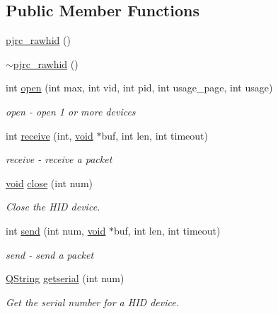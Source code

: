 \subsection*{\-Public \-Member \-Functions}
\begin{DoxyCompactItemize}
\item 
\hyperlink{group___raw_h_i_d_plugin_gac45cb09ef64b6ae7d47e4d8a3a8ffdbe}{pjrc\-\_\-rawhid} ()
\item 
\hyperlink{group___raw_h_i_d_plugin_ga2ddf20ce0f573f8fdaae4134abe0c33f}{$\sim$pjrc\-\_\-rawhid} ()
\item 
int \hyperlink{group___raw_h_i_d_plugin_ga5ec309dd6bff41a84e52450d10db5fa7}{open} (int max, int vid, int pid, int usage\-\_\-page, int usage)
\begin{DoxyCompactList}\small\item\em open -\/ open 1 or more devices \end{DoxyCompactList}\item 
int \hyperlink{group___raw_h_i_d_plugin_gad2cd7d0625e39c7743d3bd814c5829d1}{receive} (int, \hyperlink{group___u_a_v_objects_plugin_ga444cf2ff3f0ecbe028adce838d373f5c}{void} $\ast$buf, int len, int timeout)
\begin{DoxyCompactList}\small\item\em receive -\/ receive a packet \end{DoxyCompactList}\item 
\hyperlink{group___u_a_v_objects_plugin_ga444cf2ff3f0ecbe028adce838d373f5c}{void} \hyperlink{group___raw_h_i_d_plugin_gaa8ef1b93b6d941b6213a87ccdcd45d91}{close} (int num)
\begin{DoxyCompactList}\small\item\em \-Close the \-H\-I\-D device. \end{DoxyCompactList}\item 
int \hyperlink{group___raw_h_i_d_plugin_gac3f9d785ee170f6331278e39c6f43c00}{send} (int num, \hyperlink{group___u_a_v_objects_plugin_ga444cf2ff3f0ecbe028adce838d373f5c}{void} $\ast$buf, int len, int timeout)
\begin{DoxyCompactList}\small\item\em send -\/ send a packet \end{DoxyCompactList}\item 
\hyperlink{group___u_a_v_objects_plugin_gab9d252f49c333c94a72f97ce3105a32d}{\-Q\-String} \hyperlink{group___raw_h_i_d_plugin_gad851d6feef1ebb7256895d5aab3ed3a4}{getserial} (int num)
\begin{DoxyCompactList}\small\item\em \-Get the serial number for a \-H\-I\-D device. \end{DoxyCompactList}\end{DoxyCompactItemize}


